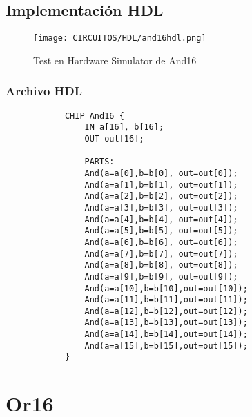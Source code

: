 \documentclass[12pt]{article}
\begin{document}
		\subsection{Implementación HDL}
		\begin{figure}[H]
			\centering
			\texttt{[image: CIRCUITOS/HDL/and16hdl.png]}
			\caption{Test en Hardware Simulator de And16 \cite{nand2tetris}}
			\label{fig:hdland16}
		\end{figure}
		\subsubsection{Archivo HDL}
		\begin{lstlisting}
			CHIP And16 {
				IN a[16], b[16];
				OUT out[16];

				PARTS:
				And(a=a[0],b=b[0], out=out[0]);
				And(a=a[1],b=b[1], out=out[1]);
				And(a=a[2],b=b[2], out=out[2]);
				And(a=a[3],b=b[3], out=out[3]);
				And(a=a[4],b=b[4], out=out[4]);
				And(a=a[5],b=b[5], out=out[5]);
				And(a=a[6],b=b[6], out=out[6]);
				And(a=a[7],b=b[7], out=out[7]);
				And(a=a[8],b=b[8], out=out[8]);
				And(a=a[9],b=b[9], out=out[9]);
				And(a=a[10],b=b[10],out=out[10]);
				And(a=a[11],b=b[11],out=out[11]);
				And(a=a[12],b=b[12],out=out[12]);
				And(a=a[13],b=b[13],out=out[13]);
				And(a=a[14],b=b[14],out=out[14]);
				And(a=a[15],b=b[15],out=out[15]);
			}
		\end{lstlisting}
		\newpage


		\section{Or16}
\end{document}
